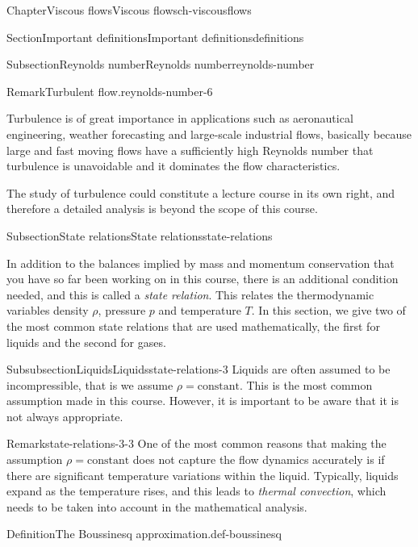 \documentclass[oneside,10pt,]{book}
\numberwithin{equation}{section}
\begin{document}
\begin{chapterptx}{Chapter}{Viscous flows}{}{Viscous flows}{}{}{ch-viscousflows}
\begin{sectionptx}{Section}{Important definitions}{}{Important definitions}{}{}{definitions}
\begin{subsectionptx}{Subsection}{Reynolds number}{}{Reynolds number}{}{}{reynolds-number}
\begin{remark}{Remark}{Turbulent flow.}{reynolds-number-6}
\par
Turbulence is of great importance in applications such as aeronautical engineering, weather forecasting and large-scale industrial flows, basically because large and fast moving flows have a sufficiently high Reynolds number that turbulence is unavoidable and it dominates the flow characteristics.%
\par
The study of turbulence could constitute a lecture course in its own right, and therefore a detailed analysis is beyond the scope of this course.%
\end{remark}
\end{subsectionptx}
%
%
\typeout{************************************************}
\typeout{************************************************}
%
\begin{subsectionptx}{Subsection}{State relations}{}{State relations}{}{}{state-relations}
\begin{introduction}{}%
In addition to the balances implied by mass and momentum conservation that you have so far been working on in this course, there is an additional condition needed, and this is called a \emph{state relation}. This relates the thermodynamic variables density \(\rho\), pressure \(p\) and temperature \(T\). In this section, we give two of the most common state relations that are used mathematically, the first for liquids and the second for gases.%
\end{introduction}%
%
%
\typeout{************************************************}
\typeout{************************************************}
%
\begin{subsubsectionptx}{Subsubsection}{Liquids}{}{Liquids}{}{}{state-relations-3}
Liquids are often assumed to be incompressible, that is we assume \(\rho = \textrm{constant}\). This is the most common assumption made in this course. However, it is important to be aware that it is not always appropriate.%
\begin{remark}{Remark}{}{state-relations-3-3}%
One of the most common reasons that making the assumption \(\rho = \textrm{constant}\) does not capture the flow dynamics accurately is if there are significant temperature variations within the liquid. Typically, liquids expand as the temperature rises, and this leads to \emph{thermal convection}, which needs to be taken into account in the mathematical analysis.%
\end{remark}
\begin{definition}{Definition}{The Boussinesq approximation.}{def-boussinesq}%

\end{definition}
\end{subsubsectionptx}
\end{subsectionptx}
\end{sectionptx}
\end{chapterptx}
\end{document}
